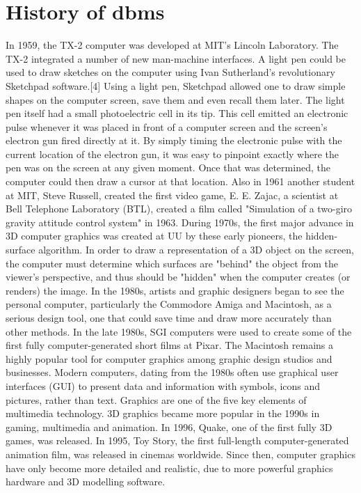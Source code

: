 \section{History of dbms }
In 1959, the TX-2 computer was developed at MIT's Lincoln Laboratory. The TX-2 integrated a number of new man-machine interfaces. A light pen could be used to draw sketches on the computer using Ivan Sutherland's revolutionary Sketchpad software.[4] Using a light pen, Sketchpad allowed one to draw simple shapes on the computer screen, save them and even recall them later. The light pen itself had a small photoelectric cell in its tip. This cell emitted an electronic pulse whenever it was placed in front of a computer screen and the screen's electron gun fired directly at it. By simply timing the electronic pulse with the current location of the electron gun, it was easy to pinpoint exactly where the pen was on the screen at any given moment. Once that was determined, the computer could then draw a cursor at that location. Also in 1961 another student at MIT, Steve Russell, created the first video game, E. E. Zajac, a scientist at Bell Telephone Laboratory (BTL), created a film called "Simulation of a two-giro gravity attitude control system" in 1963. 
During 1970s, the first major advance in 3D computer graphics was created at UU by these early pioneers, the hidden-surface algorithm. In order to draw a representation of a 3D object on the screen, the computer must determine which surfaces are "behind" the object from the viewer's perspective, and thus should be "hidden" when the computer creates (or renders) the image. 
In the 1980s, artists and graphic designers began to see the personal computer, particularly the Commodore Amiga and Macintosh, as a serious design tool, one that could save time and draw more accurately than other methods. In the late 1980s, SGI computers were used to create some of the first fully computer-generated short films at Pixar. The Macintosh remains a highly popular tool for computer graphics among graphic design studios and businesses. Modern computers, dating from the 1980s often use graphical user interfaces (GUI) to present data and information with symbols, icons and pictures, rather than text. Graphics are one of the five key elements of multimedia technology. 
3D graphics became more popular in the 1990s in gaming, multimedia and animation. In 1996, Quake, one of the first fully 3D games, was released. In 1995, Toy Story, the first full-length computer-generated animation film, was released in cinemas worldwide. Since then, computer graphics have only become more detailed and realistic, due to more powerful graphics hardware and 3D modelling software.

